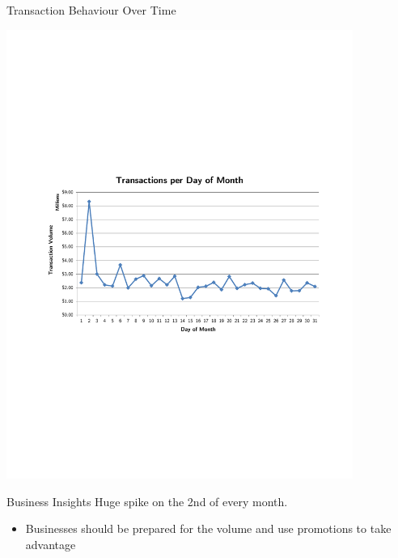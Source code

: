 \documentclass[xcolor=dvipsnames]{beamer}
\begin{document}
\begin{frame}[t]{Transaction Behaviour Over Time}
	\vspace{-4pt}
	\centerline{\includegraphics[width=0.85\textwidth]{transactions-per-day}}
	\vspace{-8pt}
	\begin{block}{Business Insights}
		\small
		Huge spike on the 2nd of every month.\\[-8pt]
		\begin{itemize}
			\item Businesses should be prepared for the volume and use promotions to take advantage
		\end{itemize}
	\end{block}
\end{frame}

\end{document}
